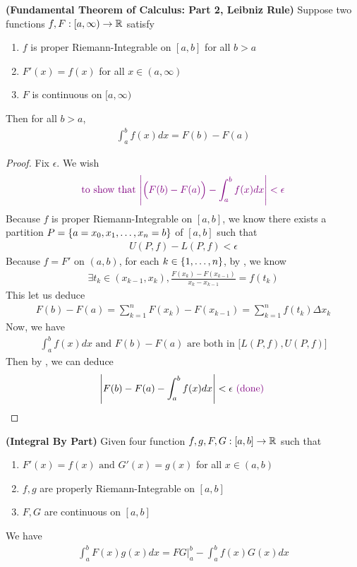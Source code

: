 \documentclass{report}
\begin{document}
\begin{theorem}
\label{FTC2}
\textbf{(Fundamental Theorem of Calculus: Part 2, Leibniz Rule)} Suppose two functions $f,F:[a,\infty )\rightarrow \mathbb{R}$ satisfy 
\begin{enumerate}[label=(\alph*)]
  \item $f$ is proper Riemann-Integrable on $[a,b]$ for all $b>a$ 
\item $F'(x)=f(x)$ for all $x \in (a, \infty)$ 
\item $F$ is continuous on  $[a,\infty)$
\end{enumerate}
Then for all $b>a$, 
\begin{align*}
\int_a^b f(x)dx=F(b)-F(a)
\end{align*}
\end{theorem}
\begin{proof}
Fix $\epsilon $. We wish 
\begin{align*}
\textcolor{violet}{\text{ to show that $\left|\Big( F(b)-F(a)\Big)-\int_a^b f(x)dx\right|<\epsilon $ }}
\end{align*}
Because $f$ is proper Riemann-Integrable on $[a,b]$, we know there exists a partition $P=\{ a=x_0,x_1,\dots , x_n=b \}$ of  $[a,b]$ such that 
\begin{align}
\label{FP}
U(P,f)-L(P,f)<\epsilon 
\end{align}
Because $f=F'$ on  $(a,b)$, for each $k \in \{ 1,\dots ,n \}$, by  , we know 
\begin{align*}
\exists t_k \in (x_{k-1},x_k), \frac{F(x_k)-F(x_{k-1})}{x_k-x_{k-1}}=f(t_k)
\end{align*}
This let us deduce
\begin{align*}
F(b)-F(a)=\sum_{k=1}^n F(x_k)-F(x_{k-1})=\sum_{k=1}^n f(t_k) \Delta x_k
\end{align*}
Now, we have 
\begin{align*}
  \int_a^b f(x)dx\text{ and }F(b)-F(a)\text{ are both in }\big[ L(P,f),U(P,f) \big]
\end{align*}
Then by , we can deduce 
\begin{align*}
\left|F(b)-F(a)- \int_a^b f(x)dx\right|<\epsilon \textcolor{violet}{\text{ (done) }}
\end{align*}




\end{proof}
\begin{theorem}
\textbf{(Integral By Part)} Given four function $f,g,F,G:[a,b]\rightarrow \mathbb{R}$ such that 

\begin{enumerate}[label=(\alph*)]
  \item $F'(x)=f(x)\text{ and }G'(x)=g(x)$ for all $x\in (a,b)$ 
  \item $f,g$ are properly Riemann-Integrable on  $[a,b]$ 
  \item $F,G$ are continuous on  $[a,b]$
\end{enumerate}
We have
\begin{align}
\label{FI}
\int_a^b F(x)g(x)dx=FG\Big|^b_a-\int_a^b f(x)G(x)dx
\end{align}
\end{theorem}
\end{document}
